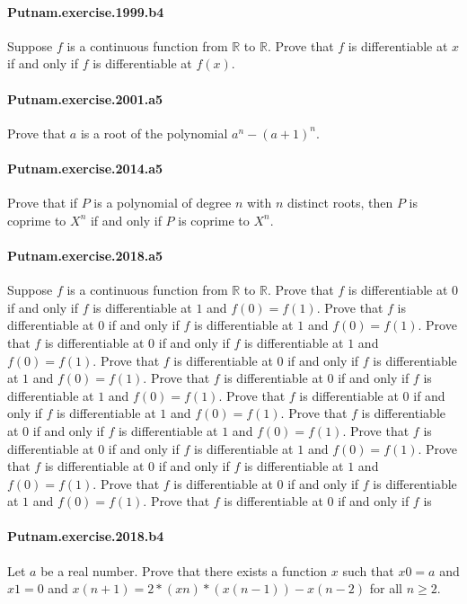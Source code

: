 \documentclass{article}
\begin{document}
\paragraph{Putnam.exercise.1999.b4} Suppose $f$ is a continuous function from $\mathbb{R}$ to $\mathbb{R}$. Prove that $f$ is differentiable at $x$ if and only if $f$ is differentiable at $f(x)$.

\paragraph{Putnam.exercise.2001.a5} Prove that $a$ is a root of the polynomial $a^n - (a+1)^n$.

\paragraph{Putnam.exercise.2014.a5} Prove that if $P$ is a polynomial of degree $n$ with $n$ distinct roots, then $P$ is coprime to $X^n$ if and only if $P$ is coprime to $X^n$.

\paragraph{Putnam.exercise.2018.a5} Suppose $f$ is a continuous function from $\mathbb{R}$ to $\mathbb{R}$. Prove that $f$ is differentiable at $0$ if and only if $f$ is differentiable at $1$ and $f(0) = f(1)$. Prove that $f$ is differentiable at $0$ if and only if $f$ is differentiable at $1$ and $f(0) = f(1)$. Prove that $f$ is differentiable at $0$ if and only if $f$ is differentiable at $1$ and $f(0) = f(1)$. Prove that $f$ is differentiable at $0$ if and only if $f$ is differentiable at $1$ and $f(0) = f(1)$. Prove that $f$ is differentiable at $0$ if and only if $f$ is differentiable at $1$ and $f(0) = f(1)$. Prove that $f$ is differentiable at $0$ if and only if $f$ is differentiable at $1$ and $f(0) = f(1)$. Prove that $f$ is differentiable at $0$ if and only if $f$ is differentiable at $1$ and $f(0) = f(1)$. Prove that $f$ is differentiable at $0$ if and only if $f$ is differentiable at $1$ and $f(0) = f(1)$. Prove that $f$ is differentiable at $0$ if and only if $f$ is differentiable at $1$ and $f(0) = f(1)$. Prove that $f$ is differentiable at $0$ if and only if $f$ is differentiable at $1$ and $f(0) = f(1)$. Prove that $f$ is differentiable at $0$ if and only if $f$ is

\paragraph{Putnam.exercise.2018.b4} Let $a$ be a real number. Prove that there exists a function $x$ such that $x 0 = a$ and $x 1 = 0$ and $x (n+1) = 2*(x n)*(x (n-1)) - x (n-2)$ for all $n \geq 2$.
\end{document}
